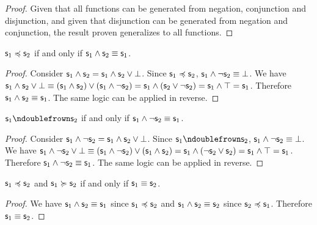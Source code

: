 \documentclass[11pt,letterpaper,fleqn]{memoir} %
\begin{document}
\begin{mathSection}
\begin{proof}
		Given that all functions can be generated from negation, conjunction and disjunction, and given that disjunction can be generated from negation and conjunction, the result proven generalizes to all functions.
	\end{proof}
	
	\begin{prop}
		$\mathsf{s}_1 \preccurlyeq \mathsf{s}_2$ if and only if $\mathsf{s}_1 \wedge \mathsf{s}_2 \equiv \mathsf{s}_1$.
	\end{prop}
	
	\begin{proof}
		Consider $\mathsf{s}_1 \wedge \mathsf{s}_2 = \mathsf{s}_1 \wedge \mathsf{s}_2 \vee \bot$. Since $\mathsf{s}_1 \preccurlyeq \mathsf{s}_2$, $\mathsf{s}_1 \wedge \neg \mathsf{s}_2 \equiv \bot$. We have $\mathsf{s}_1 \wedge \mathsf{s}_2 \vee \bot \equiv ( \mathsf{s}_1 \wedge \mathsf{s}_2 ) \vee (\mathsf{s}_1 \wedge \neg \mathsf{s}_2) = \mathsf{s}_1 \wedge (\mathsf{s}_2 \vee \neg \mathsf{s}_2) = \mathsf{s}_1 \wedge \top = \mathsf{s}_1$. Therefore $\mathsf{s}_1 \wedge \mathsf{s}_2 \equiv \mathsf{s}_1$. The same logic can be applied in reverse.
	\end{proof}	
	
	\begin{prop}
		$\stmt_1 \ncomp \stmt_2$ if and only if $\mathsf{s}_1 \wedge \neg \mathsf{s}_2 \equiv \mathsf{s}_1$.
	\end{prop}
	
	\begin{proof}
		Consider $\mathsf{s}_1 \wedge \neg \mathsf{s}_2 = \mathsf{s}_1 \wedge \mathsf{s}_2 \vee \bot$. Since $\stmt_1 \ncomp \stmt_2$, $\mathsf{s}_1 \wedge \neg \mathsf{s}_2 \equiv \bot$. We have $\mathsf{s}_1 \wedge \neg \mathsf{s}_2 \vee \bot \equiv ( \mathsf{s}_1 \wedge \neg \mathsf{s}_2 ) \vee (\mathsf{s}_1 \wedge \mathsf{s}_2) = \mathsf{s}_1 \wedge (\neg \mathsf{s}_2 \vee \mathsf{s}_2) = \mathsf{s}_1 \wedge \top = \mathsf{s}_1$. Therefore $\mathsf{s}_1 \wedge \neg \mathsf{s}_2 \equiv \mathsf{s}_1$. The same logic can be applied in reverse.
	\end{proof}	
	
	\begin{prop}
		$\mathsf{s}_1 \preccurlyeq \mathsf{s}_2$ and $\mathsf{s}_1 \succcurlyeq \mathsf{s}_2$ if and only if $\mathsf{s}_1 \equiv \mathsf{s}_2$.
	\end{prop}
	
	\begin{proof}
		We have $\mathsf{s}_1 \wedge \mathsf{s}_2 \equiv \mathsf{s}_1$ since $\mathsf{s}_1 \preccurlyeq \mathsf{s}_2$ and $\mathsf{s}_1 \wedge \mathsf{s}_2 \equiv \mathsf{s}_2$ since $\mathsf{s}_2 \preccurlyeq \mathsf{s}_1$. Therefore $\mathsf{s}_1 \equiv \mathsf{s}_2$.
	\end{proof}	
\end{mathSection}
\end{document}
